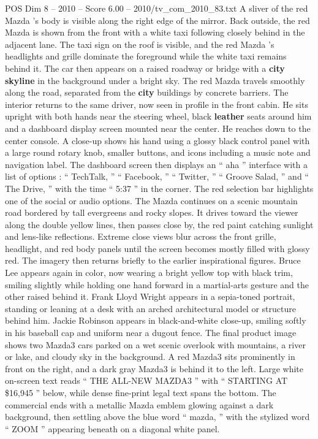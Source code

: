 \begin{textsample}{POS Dim 8 – 2010 – Score 6.00 – 2010/tv\_com\_2010\_83.txt}
A sliver of the red Mazda ’s body is visible along the right edge of the mirror.
Back outside, the red Mazda is shown from the front with a white taxi following closely behind in the adjacent lane.
The taxi sign on the roof is visible, and the red Mazda ’s headlights and grille dominate the foreground while the white taxi remains behind it.
The car then appears on a raised roadway or bridge with a \textbf{city} \textbf{skyline} in the background under a bright sky.
The red Mazda travels smoothly along the road, separated from the \textbf{city} buildings by concrete barriers.
The interior returns to the same driver, now seen in profile in the front cabin.
He sits upright with both hands near the steering wheel, black \textbf{leather} seats around him and a dashboard display screen mounted near the center.
He reaches down to the center console.
A close-up shows his hand using a glossy black control panel with a large round rotary knob, smaller buttons, and icons including a music note and navigation label.
The dashboard screen then displays an “ aha ” interface with a list of options : “ TechTalk, ” “ Facebook, ” “ Twitter, ” “ Groove Salad, ” and “ The Drive, ” with the time “ 5:37 ” in the corner.
The red selection bar highlights one of the social or audio options.
The Mazda continues on a scenic mountain road bordered by tall evergreens and rocky slopes.
It drives toward the viewer along the double yellow lines, then passes close by, the red paint catching sunlight and lens-like reflections.
Extreme close views blur across the front grille, headlight, and red body panels until the screen becomes mostly filled with glossy red.
The imagery then returns briefly to the earlier inspirational figures.
Bruce Lee appears again in color, now wearing a bright yellow top with black trim, smiling slightly while holding one hand forward in a martial-arts gesture and the other raised behind it.
Frank Lloyd Wright appears in a sepia-toned portrait, standing or leaning at a desk with an arched architectural model or structure behind him.
Jackie Robinson appears in black-and-white close-up, smiling softly in his baseball cap and uniform near a dugout fence.
The final product image shows two Mazda3 cars parked on a wet scenic overlook with mountains, a river or lake, and cloudy sky in the background.
A red Mazda3 sits prominently in front on the right, and a dark gray Mazda3 is behind it to the left.
Large white on-screen text reads “ THE ALL-NEW MAZDA3 ” with “ STARTING AT \$16,945 ” below, while dense fine-print legal text spans the bottom.
The commercial ends with a metallic Mazda emblem glowing against a dark background, then settling above the blue word “ mazda, ” with the stylized word “ ZOOM ” appearing beneath on a diagonal white panel.

\end{textsample}
